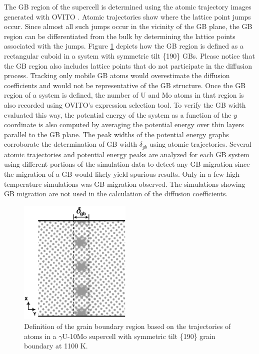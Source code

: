 \documentclass{elsarticle}
\begin{document}
The GB region of the supercell is determined using the atomic trajectory images generated with OVITO \cite{ovito}. Atomic trajectories show where the lattice point jumps occur. Since almost all such jumps occur in the vicinity of the GB plane, the GB region can be differentiated from the bulk by determining the lattice points associated with the jumps. Figure \ref{fig:def} depicts how the GB region is defined as a rectangular cuboid in a system with symmetric tilt \{190\} GBs. Please notice that the GB region also includes lattice points that do not participate in the diffusion process. Tracking only mobile GB atoms would overestimate the diffusion coefficients and would not be representative of the GB structure. Once the GB region of a system is defined, the number of U and Mo atoms in that region is also recorded using OVITO's expression selection tool. To verify the GB width evaluated this way, the potential energy of the system as a function of the $y$ coordinate is also computed by averaging the potential energy over thin layers parallel to the GB plane. The peak widths of the potential energy graphs corroborate the determination of GB width $\delta_{gb}$ using atomic trajectories. Several atomic trajectories and potential energy peaks are analyzed for each GB system using different portions of the simulation data to detect any GB migration since the migration of a GB would likely yield spurious results. Only in a few high-temperature simulations was GB migration observed. The simulations showing GB migration are not used in the calculation of the diffusion coefficients.

\begin{figure}[!ht]
\centering
\includegraphics[height=6cm]{gb_def.png}
\caption{Definition of the grain boundary region based on the trajectories of atoms in a $\gamma$U-10Mo supercell with symmetric tilt \{190\} grain boundary at 1100 K.}
\label{fig:def}
\end{figure}
\end{document}
